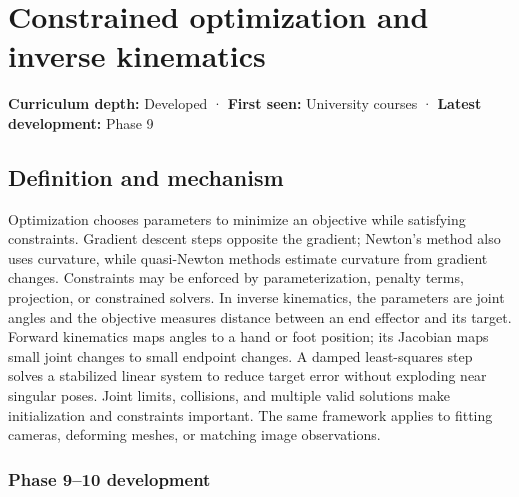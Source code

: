 \hypertarget{appendix-29f4bea4c2bb}{}\label{referencestart:appendix-29f4bea4c2bb}
\section{Constrained optimization and inverse kinematics}\label{appendix-29f4bea4c2bb-constrained-optimization-and-inverse-kinematics}

\hypertarget{appendix-29f4bea4c2bb-constrained-optimization-and-inverse-kinematics}{}

\textbf{Curriculum depth:} Developed · \textbf{First seen:} University courses · \textbf{Latest development:} Phase 9

\begin{allmightroledefinition}

\subsection{Definition and mechanism}\label{appendix-29f4bea4c2bb-definition-and-mechanism}

\hypertarget{appendix-29f4bea4c2bb-definition-and-mechanism}{}

Optimization chooses parameters to minimize an objective while satisfying constraints. Gradient descent steps opposite the gradient; Newton's method also uses curvature, while quasi-Newton methods estimate curvature from gradient changes. Constraints may be enforced by parameterization, penalty terms, projection, or constrained solvers. In inverse kinematics, the parameters are joint angles and the objective measures distance between an end effector and its target. Forward kinematics maps angles to a hand or foot position; its Jacobian maps small joint changes to small endpoint changes. A damped least-squares step solves a stabilized linear system to reduce target error without exploding near singular poses. Joint limits, collisions, and multiple valid solutions make initialization and constraints important. The same framework applies to fitting cameras, deforming meshes, or matching image observations.

\end{allmightroledefinition}

\subsubsection{Phase 9--10 development}\label{appendix-29f4bea4c2bb-phase-910-development}

\hypertarget{appendix-29f4bea4c2bb-phase-910-development}{}

